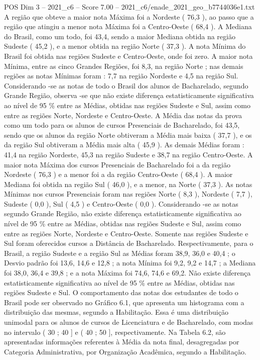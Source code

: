\begin{textsample}{POS Dim 3 – 2021\_c6 – Score 7.00 – 2021\_c6/enade\_2021\_geo\_b7744036e1.txt}
A região que obteve a maior nota Máxima foi a Nordeste ( 76,3 ), ao passo que a região que atingiu a menor nota Máxima foi a Centro-Oeste ( 68,4 ).
A Mediana do Brasil, como um todo, foi 43,4, sendo a maior Mediana obtida na região Sudeste ( 45,2 ), e a menor obtida na região Norte ( 37,3 ).
A nota Mínima do Brasil foi obtida nas regiões Sudeste e Centro-Oeste, onde foi zero.
A maior nota Mínima, entre as cinco Grandes Regiões, foi 8,3, na região Norte ; nas demais regiões as notas Mínimas foram : 7,7 na região Nordeste e 4,5 na região Sul.
Considerando -se as notas de todo o Brasil dos alunos de Bacharelado, segundo Grande Região, observa -se que não existe diferença estatisticamente significativa ao nível de 95 \% entre as Médias, obtidas nas regiões Sudeste e Sul, assim como entre as regiões Norte, Nordeste e Centro-Oeste.
A Média das notas da prova como um todo para os alunos de cursos Presenciais de Bacharelado, foi 43,5, sendo que os alunos da região Norte obtiveram a Média mais baixa ( 37,7 ), e os da região Sul obtiveram a Média mais alta ( 45,9 ).
As demais Médias foram : 41,4 na região Nordeste, 45,3 na região Sudeste e 38,7 na região Centro-Oeste.
A maior nota Máxima dos cursos Presenciais de Bacharelado foi a da região Nordeste ( 76,3 ) e a menor foi a da região Centro-Oeste ( 68,4 ).
A maior Mediana foi obtida na região Sul ( 46,0 ), e a menor, na Norte ( 37,3 ).
As notas Mínimas nos cursos Presenciais foram nas regiões Norte ( 8,3 ), Nordeste ( 7,7 ), Sudeste ( 0,0 ), Sul ( 4,5 ) e Centro-Oeste ( 0,0 ).
Considerando -se as notas segundo Grande Região, não existe diferença estatisticamente significativa ao nível de 95 \% entre as Médias, obtidas nas regiões Sudeste e Sul, assim como entre as regiões Norte, Nordeste e Centro-Oeste.
Somente nas regiões Sudeste e Sul foram oferecidos cursos a Distância de Bacharelado.
Respectivamente, para o Brasil, a região Sudeste e a região Sul as Médias foram 38,9, 36,0 e 40,4 ; o Desvio padrão foi 13,6, 14,6 e 12,8 ; a nota Mínima foi 9,2, 9,2 e 14,7 ; a Mediana foi 38,0, 36,4 e 39,8 ; e a nota Máxima foi 74,6, 74,6 e 69,2.
Não existe diferença estatisticamente significativa ao nível de 95 \% entre as Médias, obtidas nas regiões Sudeste e Sul.
O comportamento das notas dos estudantes de todo o Brasil pode ser observado no Gráfico 6.1, que apresenta um histograma com a distribuição das mesmas, segundo a Habilitação.
Essa é uma distribuição unimodal para os alunos de cursos de Licenciatura e de Bacharelado, com modas no intervalo ( 30 ; 40 ] e ( 40 ; 50 ], respectivamente.
Na Tabela 6.2, são apresentadas informações referentes à Média da nota final, desagregadas por Categoria Administrativa, por Organização Acadêmica, segundo a Habilitação.

\end{textsample}
